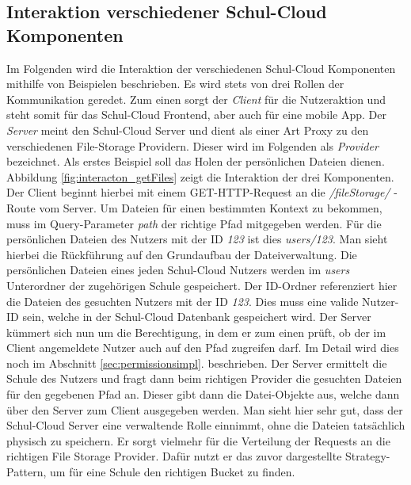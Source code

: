\subsection{Interaktion verschiedener Schul-Cloud Komponenten}
\label{sec:interactionconcept}

Im Folgenden wird die Interaktion der verschiedenen Schul-Cloud Komponenten mithilfe von Beispielen beschrieben. Es wird stets von drei Rollen der Kommunikation geredet. Zum einen sorgt der \textit{Client} für die Nutzeraktion und steht somit für das Schul-Cloud Frontend, aber auch für eine mobile App. Der \textit{Server} meint den Schul-Cloud Server und dient als einer Art Proxy zu den verschiedenen File-Storage Providern. Dieser wird im Folgenden als \textit{Provider} bezeichnet. Als erstes Beispiel soll das Holen der persönlichen Dateien dienen. Abbildung \ref{fig:interacton_getFiles} zeigt die Interaktion der drei Komponenten. Der Client beginnt hierbei mit einem GET-HTTP-Request an die \textit{/fileStorage/} - Route vom Server. Um Dateien für einen bestimmten Kontext zu bekommen, muss im Query-Parameter \textit{path} der richtige Pfad mitgegeben werden. Für die persönlichen Dateien des Nutzers mit der ID \textit{123} ist dies \textit{users/123}. Man sieht hierbei die Rückführung auf den Grundaufbau der Dateiverwaltung. Die persönlichen Dateien eines jeden Schul-Cloud Nutzers werden im \textit{users} Unterordner der zugehörigen Schule gespeichert. Der ID-Ordner referenziert hier die Dateien des gesuchten Nutzers mit der ID \textit{123}. Dies muss eine valide Nutzer-ID sein, welche in der Schul-Cloud Datenbank gespeichert wird. Der Server kümmert sich nun um die Berechtigung, in dem er zum einen prüft, ob der im Client angemeldete Nutzer auch auf den Pfad zugreifen darf. Im Detail wird dies noch im Abschnitt \ref{sec:permissionsimpl}. beschrieben. Der Server ermittelt die Schule des Nutzers und fragt dann beim richtigen Provider die gesuchten Dateien für den gegebenen Pfad an. Dieser gibt dann die Datei-Objekte aus, welche dann über den Server zum Client ausgegeben werden. Man sieht hier sehr gut, dass der Schul-Cloud Server eine verwaltende Rolle einnimmt, ohne die Dateien tatsächlich physisch zu speichern. Er sorgt vielmehr für die Verteilung der Requests an die richtigen File Storage Provider. Dafür nutzt er das zuvor dargestellte Strategy-Pattern, um für eine Schule den richtigen Bucket zu finden.

